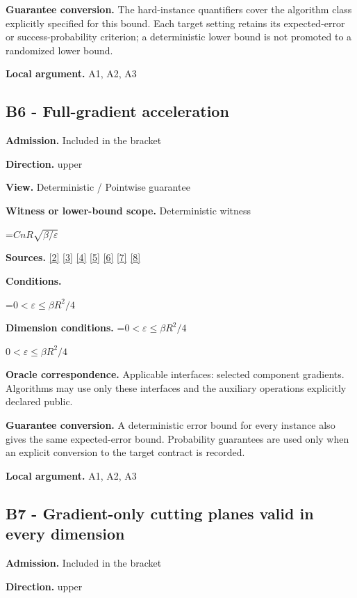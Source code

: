 \documentclass[10pt,a4paper]{article}
\newcommand{\AtlasMath}[1]{\par\begingroup\centering\setbox0=\hbox{$\displaystyle #1$}\ifdim\wd0>1.4\linewidth\typeout{ATLAS WIDE FORMULA: \the\wd0}\fi\ifdim\wd0>\linewidth\resizebox{\linewidth}{!}{\box0}\else\box0\fi\par\endgroup}
\newcommand{\AtlasInlineMath}[1]{\begingroup\setbox0=\hbox{$#1$}\ifdim\wd0>.4\linewidth\endgroup\AtlasMath{#1}\else\endgroup$#1$\fi}
\begin{document}
\textbf{Guarantee conversion.} The hard-instance quantifiers cover the algorithm class explicitly specified for this bound. Each target setting retains its expected-error or success-probability criterion; a deterministic lower bound is not promoted to a randomized lower bound.

\textbf{Local argument.} A1, A2, A3

\subsection{B6 - Full-gradient acceleration}
\textbf{Admission.} Included in the bracket

\textbf{Direction.} upper

\textbf{View.} Deterministic / Pointwise guarantee

\textbf{Witness or lower-bound scope.} Deterministic witness

\AtlasMath{CnR\sqrt{\beta/\varepsilon}}
\textbf{Sources.} \href{https://proceedings.mlr.press/v97/zhou19b/zhou19b.pdf}{[2]} \href{https://arxiv.org/pdf/1405.4980}{[3]} \href{https://arxiv.org/pdf/2101.09740v2}{[4]} \href{https://arxiv.org/pdf/2609.33360v2}{[5]} \href{https://arxiv.org/pdf/2609.10874}{[6]} \href{https://www2.isye.gatech.edu/~nemirovs/MOR_AccuracyCertificates.pdf}{[7]} \href{https://arxiv.org/pdf/2609.20701}{[8]}

\textbf{Conditions.} 
\AtlasMath{0<\varepsilon\le\beta R^2/4}


\textbf{Dimension conditions.} \AtlasInlineMath{0<\varepsilon\le\beta R^2/4}

\textbf{Oracle correspondence.} Applicable interfaces: selected component gradients. Algorithms may use only these interfaces and the auxiliary operations explicitly declared public.

\textbf{Guarantee conversion.} A deterministic error bound for every instance also gives the same expected-error bound. Probability guarantees are used only when an explicit conversion to the target contract is recorded.

\textbf{Local argument.} A1, A2, A3

\subsection{B7 - Gradient-only cutting planes valid in every dimension}
\textbf{Admission.} Included in the bracket

\textbf{Direction.} upper
\end{document}
